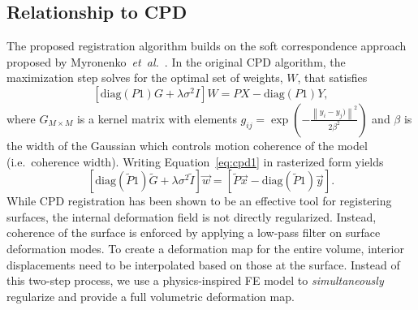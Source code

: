 \documentclass[journal]{IEEEtran}
\newcommand{\diag}{\mathrm{diag}}
\begin{document}
\subsection{Relationship to CPD}
The proposed registration algorithm builds on the soft correspondence approach proposed by Myronenko~\textit{et~al.}~\cite{Myronenko10a}. In the original CPD algorithm, the maximization step solves for the optimal set of weights, $W$, that satisfies
\begin{equation} \label{eq:cpd1}
\left[\diag(P1)G + \lambda\sigma^2I\right]W = PX - \diag\left(P1\right)Y,
\end{equation}
where $G_{M \times M}$ is a kernel matrix with elements $g_{ij}=\exp{\left(-\frac{\left\|y_i- y_j)\right\|^2}{2\beta^2}\right)}$ and $\beta$ is the width of the Gaussian which controls motion coherence of the model (i.e.~coherence width). Writing Equation~\eqref{eq:cpd1} in rasterized form yields
\begin{equation} \label{eq:cpd2}
\left[\diag(\tilde{P}1)\tilde{G} + \lambda\sigma^2\tilde{I}\right]\vec{w} = [\tilde{P}\vec{x} - \diag\left(\tilde{P}1\right)\vec{y}].
\end{equation}
While CPD registration has been shown to be an effective tool for registering surfaces, the internal deformation field is not directly regularized. Instead, coherence of the surface is enforced by applying a low-pass filter on surface deformation modes.  To create a deformation map for the entire volume, interior displacements need to be interpolated based on those at the surface.  Instead of this two-step process, we use a physics-inspired FE model to \emph{simultaneously} regularize and provide a full volumetric deformation map.
\end{document}
